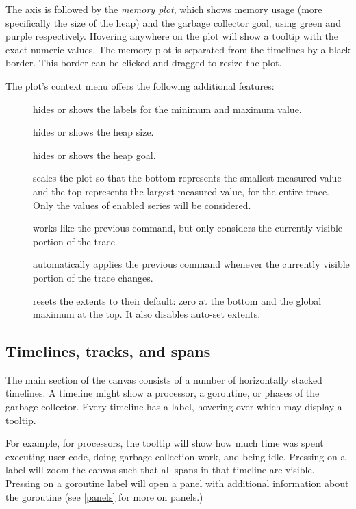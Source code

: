 \documentclass[10pt,letterpaper,oneside,openany,english]{memoir}
\newcommand{\noun}[1]{{\emph{#1}}}
\newcommand{\shortcut}{\ctrl{} or \cmdmac}
\begin{document}
The axis is followed by the \noun{memory plot}, which shows memory usage (more specifically the size of the heap) and the garbage collector goal, using green and purple respectively.
Hovering anywhere on the plot will show a tooltip with the exact numeric values.
The memory plot is separated from the timelines by a black border.
This border can be clicked and dragged to resize the plot.

The plot's context menu offers the following additional features:

\begin{description}
\item[] hides or shows the labels for the minimum and maximum value.
\item[] hides or shows the heap size.
\item[] hides or shows the heap goal.
\item[] scales the plot so that the bottom represents the smallest measured value and the top represents the largest measured value, for the entire trace.
  Only the values of enabled series will be considered.
\item[] works like the previous command, but only considers the currently visible portion of the trace.
\item[] automatically applies the previous command whenever the currently visible portion of the trace changes.
\item[] resets the extents to their default: zero at the bottom and the global maximum at the top.
  It also disables auto-set extents.
\end{description}

\subsection{Timelines, tracks, and spans}
The main section of the canvas consists of a number of horizontally stacked timelines.
A timeline might show a processor, a goroutine, or phases of the garbage collector.
Every timeline has a label, hovering over which may display a tooltip.

For example, for processors, the tooltip will show how much time was spent executing user code,
doing garbage collection work,
and being idle.
Pressing \keys{\shortcut + LMB} on a label will zoom the canvas such that all spans in that timeline are visible.
Pressing  on a goroutine label will open a panel with additional information about the goroutine (see \cref{panels} for more on panels.)
\end{document}
